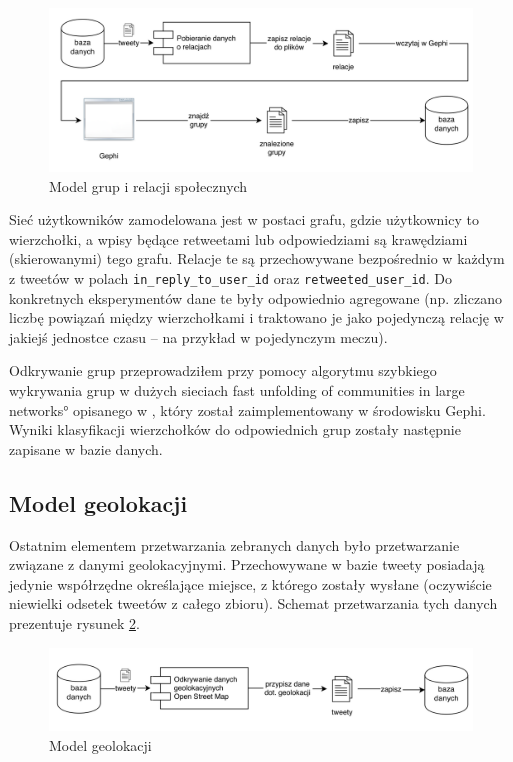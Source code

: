 \begin{figure}[ht!]
\centering
\includegraphics[width=160mm]{img/odkrywanie-relacji.png}
\caption{Model grup i relacji społecznych}
\label{image:odkrywanie-relacji}
\end{figure}


Sieć użytkowników zamodelowana jest w postaci grafu, gdzie użytkownicy to
wierzchołki, a wpisy będące retweetami lub odpowiedziami są krawędziami
(skierowanymi) tego grafu. Relacje te są przechowywane bezpośrednio w każdym z
tweetów w polach \texttt{in\_reply\_to\_user\_id} oraz
\texttt{retweeted\_user\_id}.
Do konkretnych eksperymentów dane te były odpowiednio agregowane (np. zliczano
liczbę powiązań między wierzchołkami i traktowano je jako pojedynczą relację w
jakiejś jednostce czasu -- na przykład w pojedynczym meczu).

Odkrywanie grup przeprowadziłem przy pomocy algorytmu szybkiego wykrywania grup
w dużych sieciach \ang{fast unfolding of communities in large networks}
opisanego w \cite{FastUnfoldingOfCommunites}, który został zaimplementowany w
środowisku Gephi. Wyniki klasyfikacji wierzchołków do odpowiednich grup zostały
następnie zapisane w bazie danych.


\subsection{Model geolokacji}
\label{subsection:modelgeolokacji}
Ostatnim elementem przetwarzania zebranych danych było przetwarzanie związane z
danymi geolokacyjnymi. Przechowywane w bazie tweety posiadają jedynie współrzędne
określające miejsce, z którego zostały wysłane (oczywiście niewielki odsetek
tweetów z całego zbioru). Schemat przetwarzania tych danych prezentuje rysunek
\ref{image:odkrywanie-geolokacji}.

\begin{figure}[ht!]
\centering
\includegraphics[width=160mm]{img/odkrywanie-geolokacji.png}
\caption{Model geolokacji}
\label{image:odkrywanie-geolokacji}
\end{figure}

